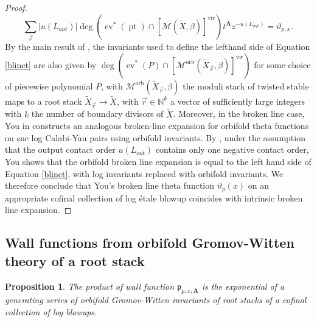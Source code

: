 \documentclass[12pt, oneside]{amsart}   	%
\newcounter{thm}
\newtheorem{proposition}[thm]{Proposition}
\newcommand{\NN}{\mathbb{N}}
\newcommand{\vir}{\operatorname{vir}}
\newcommand{\orb}{\operatorname{orb}}
\newcommand{\pt}{\operatorname{pt}}
\newcommand{\ev}{\operatorname{ev}}
\numberwithin{equation}{section}
\numberwithin{thm}{section}
\numberwithin{figure}{section}
\begin{document}
\begin{proof}
 \begin{equation}\label{blinet}
 \sum_{\beta} |u(L_{out})|\deg(\ev^*(\pt)\cap[\mathscr{M}(\widetilde{X},\beta)]^{\vir})t^{\textbf{A}}z^{-u(L_{out})} = \vartheta_{p,x}.
 \end{equation}
 By the main result of \cite{BNR2}, the invariants used to define the lefthand side of Equation \ref{blinet} are also given by $\deg(\ev^*(P)\cap[\mathscr{M}^{\orb}(\widetilde{X}_{\vec{r}},\beta)]^{\vir})$ for some choice of piecewise polynomial $P$, with $\mathscr{M}^{\orb}(\widetilde{X}_{\vec{r}},\beta)$ the moduli stack of twisted stable maps to a root stack $\widetilde{X}_{\vec{r}} \rightarrow \widetilde{X}$, with $\vec{r} \in \NN^k$ a vector of sufficiently large integers with $k$ the number of boundary divisors of $\widetilde{X}$. Moreover, in the broken line case, You in \cite{orbBL} constructs an analogous broken-line expansion for orbifold theta functions on snc log Calabi-Yau pairs using orbifold invariants. By \cite[Theorem $7.1$]{orbBL}, under the assumption that the output contact order $u(L_{out})$ contains only one negative contact order, You shows that the orbifold broken line expansion is equal to the left hand side of Equation \ref{blinet}, with log invariants replaced with orbifold invariants. We therefore conclude that You's broken line theta function $\vartheta_p(x)$ on an appropriate cofinal collection of log \'etale blowup coincides with intrinsic broken line expansion.
 \end{proof}
 
 \subsection{Wall functions from orbifold Gromov-Witten theory of a root stack}
 
 \begin{proposition}\label{worb}
 The product of wall function $\mathfrak{p}_{p,x,\textbf{A}}$ is the exponential of a generating series of orbifold Gromov-Witten invariants of root stacks of a cofinal collection of log blowups. 
 \end{proposition}
 
\end{document}
